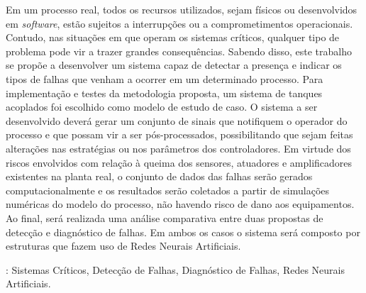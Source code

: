 Em um processo real, todos os recursos utilizados, sejam físicos ou
desenvolvidos em {\it software}, estão sujeitos a interrupções ou a
comprometimentos operacionais. Contudo, nas situações em que operam os sistemas
críticos, qualquer tipo de problema pode vir a trazer grandes consequências.
Sabendo disso, este trabalho se propõe a desenvolver um sistema capaz de
detectar a presença e indicar os tipos de falhas que venham a ocorrer em um
determinado processo. Para implementação e testes da metodologia proposta, um
sistema de tanques acoplados foi escolhido como modelo de estudo de caso. O
sistema a ser desenvolvido deverá gerar um conjunto de sinais que notifiquem o
operador do processo e que possam vir a ser pós-processados, possibilitando que
sejam feitas alterações nas estratégias ou nos parâmetros dos controladores. Em
virtude dos riscos envolvidos com relação à queima dos sensores, atuadores e
amplificadores existentes na planta real, o conjunto de dados das falhas serão
gerados computacionalmente e os resultados serão coletados a partir de
simulações numéricas do modelo do processo, não havendo risco de dano aos
equipamentos. Ao final, será realizada uma análise comparativa entre duas
propostas de detecção e diagnóstico de falhas. Em ambos os casos o sistema será
composto por estruturas que fazem uso de Redes Neurais Artificiais.

\vspace{1.5ex}

: Sistemas Críticos, Detecção de Falhas, Diagnóstico de
Falhas, Redes Neurais Artificiais.

